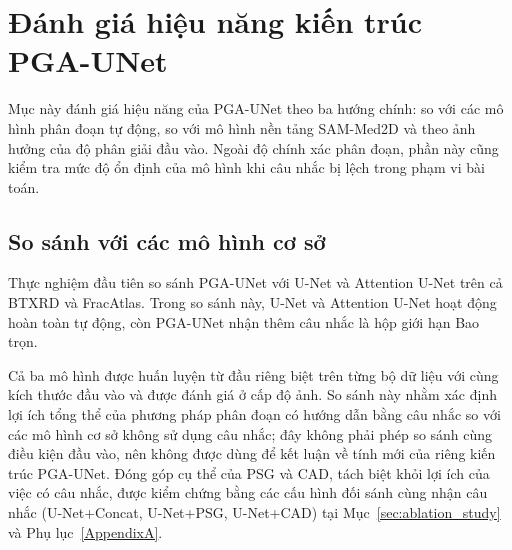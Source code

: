 \section{Đánh giá hiệu năng kiến trúc PGA-UNet}
\label{sec:danh_gia_hieu_nang}

Mục này đánh giá hiệu năng của PGA-UNet theo ba hướng chính: so với các mô hình phân đoạn tự động, so với mô hình nền tảng SAM-Med2D và theo ảnh hưởng của độ phân giải đầu vào. Ngoài độ chính xác phân đoạn, phần này cũng kiểm tra mức độ ổn định của mô hình khi câu nhắc bị lệch trong phạm vi bài toán.

\subsection{So sánh với các mô hình cơ sở}
\label{subsec:baseline_comparison}

Thực nghiệm đầu tiên so sánh PGA-UNet với U-Net và Attention U-Net trên cả BTXRD và FracAtlas. Trong so sánh này, U-Net và Attention U-Net hoạt động hoàn toàn tự động, còn PGA-UNet nhận thêm câu nhắc là hộp giới hạn Bao trọn.

Cả ba mô hình được huấn luyện từ đầu riêng biệt trên từng bộ dữ liệu với cùng kích thước đầu vào và được đánh giá ở cấp độ ảnh. So sánh này nhằm xác định lợi ích tổng thể của phương pháp phân đoạn có hướng dẫn bằng câu nhắc so với các mô hình cơ sở không sử dụng câu nhắc; đây không phải phép so sánh cùng điều kiện đầu vào, nên không được dùng để kết luận về tính mới của riêng kiến trúc PGA-UNet. Đóng góp cụ thể của PSG và CAD, tách biệt khỏi lợi ích của việc có câu nhắc, được kiểm chứng bằng các cấu hình đối sánh cùng nhận câu nhắc (U-Net+Concat, U-Net+PSG, U-Net+CAD) tại Mục~\ref{sec:ablation_study} và Phụ lục~\ref{AppendixA}.

\begin{table}[H]
    \centering
    \caption{So sánh PGA-UNet với các mô hình cơ sở trên BTXRD ở độ phân giải $512\times512$ (N=\Ntestimg~ảnh)}
    \label{tab:baseline_comparison}
    \renewcommand{\arraystretch}{1.3}
\end{table}

